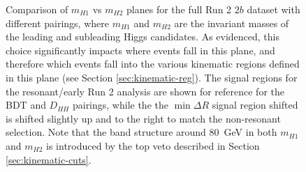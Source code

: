 \begin{figure}[ht]
\centering
{}

\caption{\label{fig:pairing-massplanes} Comparison of $m_{H1}$ vs $m_{H2}$ planes for the full Run 2 $2b$ 
dataset with different pairings, where $m_{H1}$ and $m_{H2}$ are the invariant masses of the leading and 
subleading Higgs candidates. As evidenced, this choice significantly impacts where events 
fall in this plane, and therefore which events fall into the various kinematic regions defined in 
this plane (see Section \ref{sec:kinematic-reg}). The signal regions for the resonant/early Run 2 analysis 
are shown for reference for the BDT and $D_{HH}$ pairings, while the the $\min\Delta R$ signal region shifted 
is shifted slightly up and to the right to match the non-resonant 
selection. Note that the band structure around \SI{80}{\GeV} in both $m_{H1}$ and $m_{H2}$ is introduced 
by the top veto described in Section \ref{sec:kinematic-cuts}.}
\end{figure}


